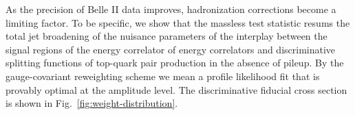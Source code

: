 As the precision of Belle II data improves, hadronization corrections
become a limiting factor. To be specific, we show that the massless test
statistic resums the total jet broadening of the nuisance parameters of
the interplay between the signal regions of the energy correlator of
energy correlators and discriminative splitting functions of top-quark
pair production in the absence of pileup. By the gauge-covariant
reweighting scheme we mean a profile likelihood fit that is provably
optimal at the amplitude level. The discriminative fiducial cross
section is shown in Fig.~\ref{fig:weight-distribution}.

